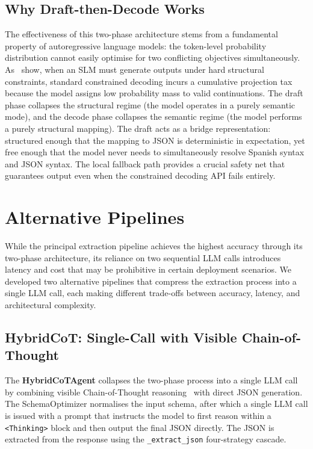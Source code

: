 \documentclass[onecolumn]{ceurart}
\begin{document}
\subsection{Why Draft-then-Decode Works}

The effectiveness of this two-phase architecture stems from a fundamental
property of autoregressive language models: the token-level probability
distribution cannot easily optimise for two conflicting objectives
simultaneously. As~\citet{reddy2026dccd} show, when an SLM must generate
outputs under hard structural constraints, standard constrained decoding
incurs a cumulative projection tax because the model assigns low probability
mass to valid continuations. The draft phase collapses the structural regime
(the model operates in a purely semantic mode), and the decode phase collapses
the semantic regime (the model performs a purely structural mapping). The draft
acts as a bridge representation: structured enough that the mapping to JSON is
deterministic in expectation, yet free enough that the model never needs to
simultaneously resolve Spanish syntax and JSON syntax. The local fallback path
provides a crucial safety net that guarantees output even when the constrained
decoding API fails entirely.


\section{Alternative Pipelines}
\label{sec:alternatives}

While the principal extraction pipeline achieves the highest accuracy through
its two-phase architecture, its reliance on two sequential LLM calls introduces
latency and cost that may be prohibitive in certain deployment scenarios. We
developed two alternative pipelines that compress the extraction process into a
single LLM call, each making different trade-offs between accuracy, latency,
and architectural complexity.

\subsection{HybridCoT: Single-Call with Visible Chain-of-Thought}

The \textbf{HybridCoTAgent} collapses the two-phase process into a single LLM
call by combining visible Chain-of-Thought reasoning~\citep{wei2022chain} with
direct JSON generation. The SchemaOptimizer normalises the input schema, after
which a single LLM call is issued with a prompt that instructs the model to
first reason within a \texttt{<Thinking>} block and then output the final JSON
directly. The JSON is extracted from the response using the
\texttt{\_extract\_json} four-strategy cascade.
\end{document}
